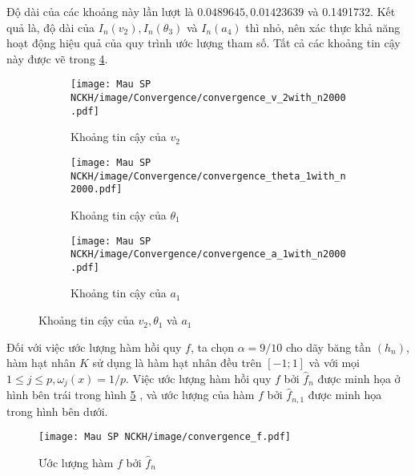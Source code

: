 Độ dài của các khoảng này lần lượt là $0.0489645,0.01423639$ và 0.1491732. Kết quả là, độ dài của $I_{n}\left(v_{2}\right), I_{n}\left(\theta_{3}\right)$ và $I_{n}\left(a_{4}\right)$ thì nhỏ, nên xác thực khả năng hoạt động hiệu quả của quy trình ước lượng tham số. Tất cả các khoảng tin cậy này được vẽ trong \ref{convergence}.
\begin{figure}[ht]
  \centering
  \begin{subfigure}[b]{0.45\textwidth}
    \centering
    \texttt{[image: Mau SP NCKH/image/Convergence/convergence\_v\_2with\_n2000.pdf]}
    \caption{Khoảng tin cậy của $v_2$}
    \label{convergence_and_confidence_of_v_1}
  \end{subfigure}
  \hfill %
  \begin{subfigure}[b]{0.45\textwidth}
    \centering
    \texttt{[image: Mau SP NCKH/image/Convergence/convergence\_theta\_1with\_n2000.pdf]}
    \caption{Khoảng tin cậy của $\theta_1$}
    \label{convergence_and_confidence_of_theta_1}
  \end{subfigure}

  \vspace{0.1cm} %
  \begin{subfigure}[b]{\textwidth}
    \centering
    \texttt{[image: Mau SP NCKH/image/Convergence/convergence\_a\_1with\_n2000.pdf]}
    \caption{Khoảng tin cậy của $a_1$}
    \label{convergence_and_confidence_ofa_1}
  \end{subfigure}
  
  \caption{Khoảng tin cậy của $v_2, \theta_1$ và $a_1$}
  \label{convergence}
\end{figure}


Đối với việc ước lượng hàm hồi quy $f$, ta chọn $\alpha=9 / 10$ cho dãy băng tần $\left(h_{n}\right)$, hàm hạt nhân $K$ sử dụng là hàm hạt nhân đều trên $[-1 ; 1]$ và với mọi $1 \leq j \leq p, \omega_{j}(x)=1 / p$. Việc ước lượng hàm hồi quy $f$ bởi $\widehat{f}_{n}$ được minh họa ở hình bên trái trong hình \ref{convergence_f} , và ước lượng của hàm $f$ bởi $\widehat{f}_{n, 1}$ được minh họa trong hình bên dưới.
\begin{figure}[ht]
  \centering
  \texttt{[image: Mau SP NCKH/image/convergence\_f.pdf]}
  \caption{Ước lượng hàm $f$ bởi $\hat{f}_n$}
  \label{convergence_f}
\end{figure}
